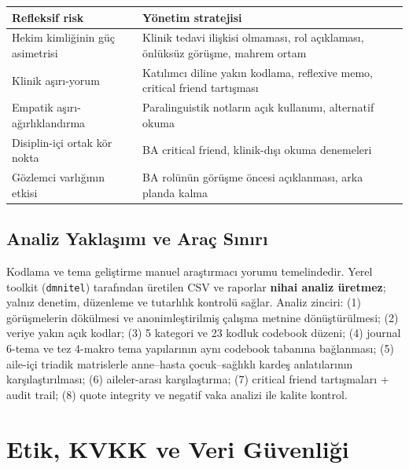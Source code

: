 \documentclass[
  turkish,
  a4paper,
  DIV=11,
  numbers=noendperiod]{scrreprt}
\newcounter{none} %
\begin{document}
{\def\LTcaptype{none} %
\begin{longtable}[]{@{}
  >{\raggedright\arraybackslash}p{}
  >{\raggedright\arraybackslash}p{}@{}}
\toprule\noalign{}
\begin{minipage}[b]{\linewidth}\raggedright
Refleksif risk
\end{minipage} & \begin{minipage}[b]{\linewidth}\raggedright
Yönetim stratejisi
\end{minipage} \\
\midrule\noalign{}
\endhead
\bottomrule\noalign{}
\endlastfoot
Hekim kimliğinin güç asimetrisi & Klinik tedavi ilişkisi olmaması, rol
açıklaması, önlüksüz görüşme, mahrem ortam \\
Klinik aşırı-yorum & Katılımcı diline yakın kodlama, reflexive memo,
critical friend tartışması \\
Empatik aşırı-ağırlıklandırma & Paralinguistik notların açık kullanımı,
alternatif okuma \\
Disiplin-içi ortak kör nokta & BA critical friend, klinik-dışı okuma
denemeleri \\
Gözlemci varlığının etkisi & BA rolünün görüşme öncesi açıklanması, arka
planda kalma \\
\end{longtable}
}

\section{Analiz Yaklaşımı ve Araç
Sınırı}\label{analiz-yaklaux15fux131mux131-ve-arauxe7-sux131nux131rux131}

Kodlama ve tema geliştirme manuel araştırmacı yorumu temelindedir. Yerel
toolkit (\texttt{dmnitel}) tarafından üretilen CSV ve raporlar
\textbf{nihai analiz üretmez}; yalnız denetim, düzenleme ve tutarlılık
kontrolü sağlar. Analiz zinciri: (1) görüşmelerin dökülmesi ve
anonimleştirilmiş çalışma metnine dönüştürülmesi; (2) veriye yakın açık
kodlar; (3) 5 kategori ve 23 kodluk codebook düzeni; (4) journal 6-tema
ve tez 4-makro tema yapılarının aynı codebook tabanına bağlanması; (5)
aile-içi triadik matrislerle anne--hasta çocuk--sağlıklı kardeş
anlatılarının karşılaştırılması; (6) aileler-arası karşılaştırma; (7)
critical friend tartışmaları + audit trail; (8) quote integrity ve
negatif vaka analizi ile kalite kontrol.

\chapter{Etik, KVKK ve Veri Güvenliği}\label{sec-etik}
\end{document}
